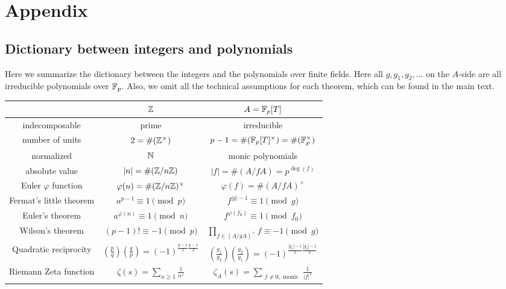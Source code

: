 \appendix
\section{Appendix}


\subsection{Dictionary between integers and polynomials}
\label{subsec:dictionary}

Here we summarize the dictionary between the integers and the polynomials over finite fields.
Here all $g, g_1, g_2, \dots$ on the $A$-side are all irreducible polynomials over $\mathbb{F}_p$.
Also, we omit all the technical assumptions for each theorem, which can be found in the main text.

\begin{table}[h]
    \begin{center}
        \begin{tabular}{c|c|c}
            \toprule
            & $\mathbb{Z}$ & $A = \mathbb{F}_p[T]$ \\
            \midrule
            indecomposable & prime & irreducible \\
            number of units &$2 = \#(\mathbb{Z}^\times)$ & $p - 1 = \# (\mathbb{F}_p[T]^\times) = \# (\mathbb{F}_p^\times)$ \\
            normalized & $\mathbb{N}$ & monic polynomials \\
            absolute value & $|n| = \# (\mathbb{Z} / n\mathbb{Z})$ & $|f| = \# (A / f A) = p^{\deg (f)}$ \\
            Euler $\varphi$ function & $\varphi(n) = \# (\mathbb{Z} / n \mathbb{Z})^\times$ & $\varphi(f) = \# (A / fA)^\times$ \\
            Fermat's little theorem & $a^{p-1} \equiv 1 \pmod{p}$ & $f^{|g| - 1} \equiv 1 \pmod{g}$ \\
            Euler's theorem & $a^{\varphi(n)} \equiv 1 \pmod{n}$ & $f^{\varphi(f_0)} \equiv 1 \pmod{f_0}$ \\
            Wilson's theorem & $(p-1)! \equiv -1 \pmod{p}$ & $\prod_{f \in (A / g A)^\times} f \equiv -1 \pmod{g}$ \\
            Quadratic reciprocity & $\left(\frac{p}{q}\right)\left(\frac{q}{p}\right) = (-1)^{\frac{p-1}{2}\frac{q-1}{2}}$ & $\left(\frac{g_1}{g_2}\right)\left(\frac{g_2}{g_1}\right) = (-1)^{\frac{|g_1| - 1}{2}\frac{|g_2| - 1}{2}}$\\
            Riemann Zeta function & $\zeta(s) = \sum_{n \ge 1}\frac{1}{n^s}$ & $\zeta_{A}(s) = \sum_{\substack{f \ne 0, \text{ monic}}} \frac{1}{|f|^s}$ \\

\end{tabular}
\end{center}
\end{table}
